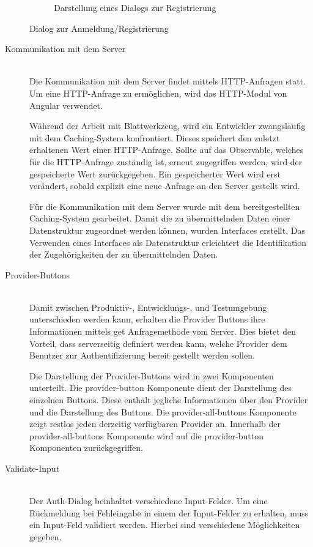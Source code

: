 \begin{figure}[h]
\begin{subfigure}{.5\textwidth}
		\caption{Darstellung eines Dialogs zur Registrierung}
		\label{fig:dialog_sign_up}
	\end{subfigure}
	\caption{Dialog zur Anmeldung/Registrierung}
	\label{fig:auth-dialog}
\end{figure}

\begin{description}
	\item[Kommunikation mit dem Server]\hfill\\
	Die Kommunikation mit dem Server findet mittels \gls{HTTP}-Anfragen statt. Um eine \gls{HTTP}-Anfrage zu ermöglichen, wird das \gls{HTTP}-Modul von Angular verwendet.

	Während der Arbeit mit Blattwerkzeug, wird ein Entwickler zwangsläufig mit dem Caching-System konfrontiert. Dieses speichert den zuletzt erhaltenen Wert einer \gls{HTTP}-Anfrage. Sollte auf das Observable, welches für die \gls{HTTP}-Anfrage zuständig ist, erneut zugegriffen werden, wird der gespeicherte Wert zurückgegeben. Ein gespeicherter Wert wird erst verändert, sobald explizit eine neue Anfrage an den Server gestellt wird.

	Für die Kommunikation mit dem Server wurde mit dem bereitgestellten Caching-System gearbeitet. Damit die zu übermittelnden Daten einer Datenstruktur zugeordnet werden können, wurden Interfaces erstellt. Das Verwenden eines Interfaces als Datenstruktur erleichtert die Identifikation der Zugehörigkeiten der zu übermittelnden Daten.

	\item[Provider-Buttons]\hfill\\
	Damit zwischen Produktiv-, Entwicklungs-, und Testumgebung unterschieden werden kann, erhalten die Provider Buttons ihre Informationen mittels get Anfragemethode vom Server. Dies bietet den Vorteil, dass serverseitig definiert werden kann, welche Provider dem Benutzer zur Authentifizierung bereit gestellt werden sollen.

	Die Darstellung der Provider-Buttons wird in zwei Komponenten unterteilt. Die provider-button Komponente dient der Darstellung des einzelnen Buttons. Diese enthält jegliche Informationen über den Provider und die Darstellung des Buttons. Die provider-all-buttons Komponente zeigt restlos jeden derzeitig verfügbaren Provider an. Innerhalb der provider-all-buttons Komponente wird auf die provider-button Komponenten zurückgegriffen.
	\item[Validate-Input]\hfill\\
	Der Auth-Dialog beinhaltet verschiedene Input-Felder. Um eine Rückmeldung bei Fehleingabe in einem der Input-Felder zu erhalten, muss ein Input-Feld validiert werden. Hierbei sind verschiedene Möglichkeiten gegeben.


\end{description}
